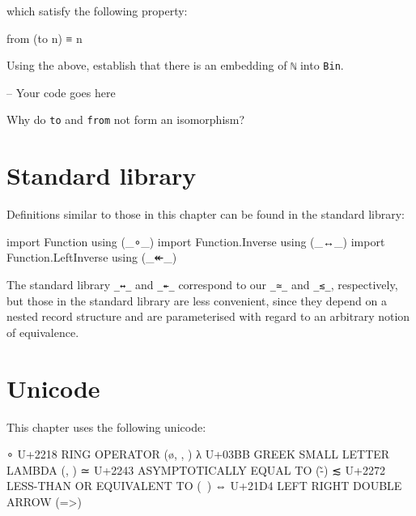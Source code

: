 which satisfy the following property:

\begin{myDisplay}
from (to n) ≡ n
\end{myDisplay}

Using the above, establish that there is an embedding of \texttt{ℕ} into
\texttt{Bin}.

\begin{fence}
\begin{code}
-- Your code goes here
\end{code}
\end{fence}

Why do \texttt{to} and \texttt{from} not form an isomorphism?

\hypertarget{standard-library}{%
\section{Standard library}\label{standard-library}}

Definitions similar to those in this chapter can be found in the
standard library:

\begin{fence}
\begin{code}
import Function using (_∘_)
import Function.Inverse using (_↔_)
import Function.LeftInverse using (_↞_)
\end{code}
\end{fence}

The standard library \texttt{\_↔\_} and \texttt{\_↞\_} correspond to our
\texttt{\_≃\_} and \texttt{\_≲\_}, respectively, but those in the
standard library are less convenient, since they depend on a nested
record structure and are parameterised with regard to an arbitrary
notion of equivalence.

\hypertarget{unicode}{%
\section{Unicode}\label{unicode}}

This chapter uses the following unicode:

\begin{myDisplay}
∘  U+2218  RING OPERATOR (\o, \circ, \comp)
λ  U+03BB  GREEK SMALL LETTER LAMBDA (\lambda, \Gl)
≃  U+2243  ASYMPTOTICALLY EQUAL TO (\~-)
≲  U+2272  LESS-THAN OR EQUIVALENT TO (\<~)
⇔  U+21D4  LEFT RIGHT DOUBLE ARROW (\<=>)
\end{myDisplay}

